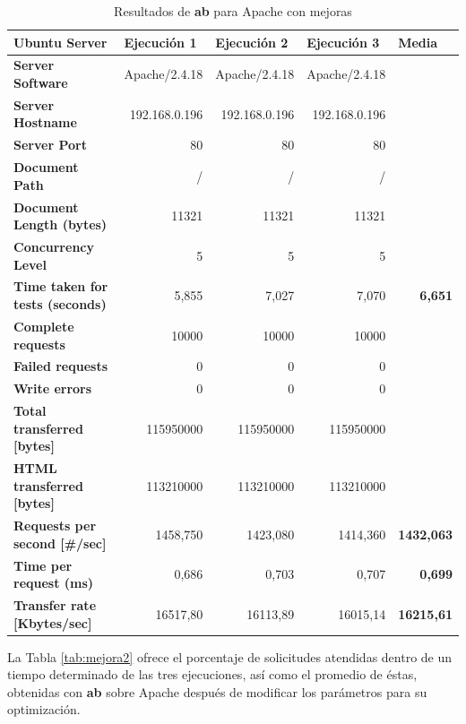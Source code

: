 \begin{table}[H]
	\centering
	\begin{tabular}{lrrrr}
		\textbf{Ubuntu Server} & \multicolumn{1}{l}{\textbf{Ejecución 1}} & \multicolumn{1}{l}{\textbf{Ejecución 2}} & \multicolumn{1}{l}{\textbf{Ejecución 3}} & \multicolumn{1}{l}{\textbf{Media}} \\
		\midrule
		\textbf{Server Software} & Apache/2.4.18 & Apache/2.4.18 & Apache/2.4.18 &  \\
		\textbf{Server Hostname} & 192.168.0.196 & 192.168.0.196 & 192.168.0.196 &  \\
		\textbf{Server Port} & 80    & 80    & 80    &  \\
		\textbf{Document Path} & /     & /     & /     &  \\
		\textbf{Document Length (bytes)} & 11321 & 11321 & 11321 &  \\
		\textbf{Concurrency Level} & 5     & 5     & 5     &  \\
		\textbf{Time taken for tests (seconds)} & 5,855 & 7,027 & 7,070 & \textbf{6,651} \\
		\textbf{Complete requests} & 10000 & 10000 & 10000 &  \\
		\textbf{Failed requests} & 0     & 0     & 0     &  \\
		\textbf{Write errors} & 0     & 0     & 0     &  \\
		\textbf{Total transferred [bytes]} & 115950000 & 115950000 & 115950000 &  \\
		\textbf{HTML transferred [bytes]} & 113210000 & 113210000 & 113210000 &  \\
		\textbf{Requests per second [\#/sec]} & 1458,750 & 1423,080 & 1414,360 & \textbf{1432,063} \\
		\textbf{Time per request (ms)} & 0,686 & 0,703 & 0,707 & \textbf{0,699} \\
		\textbf{Transfer rate [Kbytes/sec]} & 16517,80 & 16113,89 & 16015,14 & \textbf{16215,61} \\
	\end{tabular}%
	\caption{Resultados de \textbf{ab} para Apache con mejoras}
	\label{tab:mejora}%
\end{table}%

La Tabla \ref{tab:mejora2} ofrece el porcentaje de solicitudes atendidas dentro de un tiempo determinado de las tres ejecuciones, así como el promedio de éstas, obtenidas con \textbf{ab} sobre Apache después de modificar los parámetros para su optimización.

